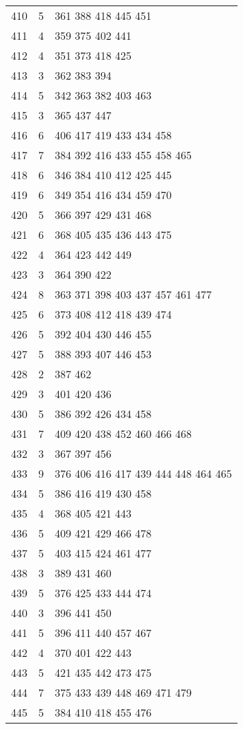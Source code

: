 \documentclass{standalone}
\begin{document}
\begin{tabular}{c c l}
410 & 5 & 361 388 418 445 451 \\
411 & 4 & 359 375 402 441 \\
412 & 4 & 351 373 418 425 \\
413 & 3 & 362 383 394 \\
414 & 5 & 342 363 382 403 463 \\
415 & 3 & 365 437 447 \\
416 & 6 & 406 417 419 433 434 458 \\
417 & 7 & 384 392 416 433 455 458 465 \\
418 & 6 & 346 384 410 412 425 445 \\
419 & 6 & 349 354 416 434 459 470 \\
420 & 5 & 366 397 429 431 468 \\
421 & 6 & 368 405 435 436 443 475 \\
422 & 4 & 364 423 442 449 \\
423 & 3 & 364 390 422 \\
424 & 8 & 363 371 398 403 437 457 461 477 \\
425 & 6 & 373 408 412 418 439 474 \\
426 & 5 & 392 404 430 446 455 \\
427 & 5 & 388 393 407 446 453 \\
428 & 2 & 387 462 \\
429 & 3 & 401 420 436 \\
430 & 5 & 386 392 426 434 458 \\
431 & 7 & 409 420 438 452 460 466 468 \\
432 & 3 & 367 397 456 \\
433 & 9 & 376 406 416 417 439 444 448 464 465 \\
434 & 5 & 386 416 419 430 458 \\
435 & 4 & 368 405 421 443 \\
436 & 5 & 409 421 429 466 478 \\
437 & 5 & 403 415 424 461 477 \\
438 & 3 & 389 431 460 \\
439 & 5 & 376 425 433 444 474 \\
440 & 3 & 396 441 450 \\
441 & 5 & 396 411 440 457 467 \\
442 & 4 & 370 401 422 443 \\
443 & 5 & 421 435 442 473 475 \\
444 & 7 & 375 433 439 448 469 471 479 \\
445 & 5 & 384 410 418 455 476 \\

\end{tabular}
\end{document}
